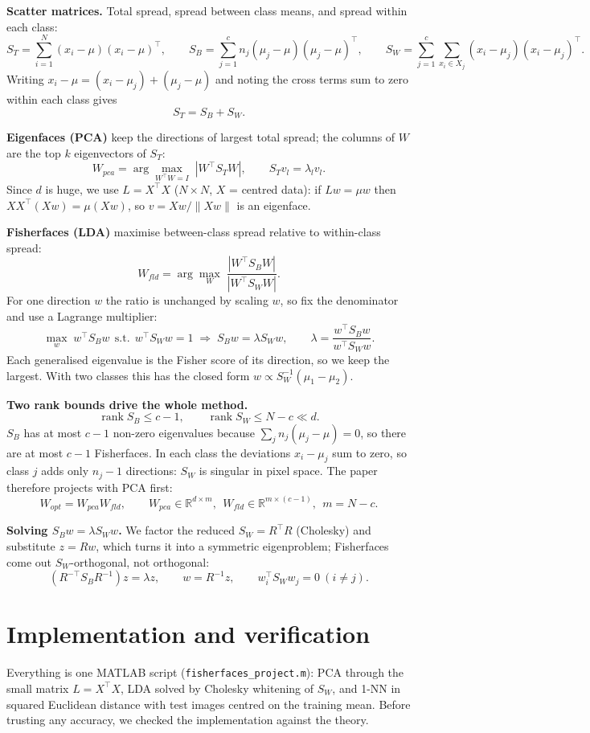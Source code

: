 \documentclass[11pt]{article}
\newcommand{\T}{^{\top}}
\begin{document}
\textbf{Scatter matrices.} Total spread, spread between class means, and spread within each class:
\[
S_T=\sum_{i=1}^{N}(x_i-\mu)(x_i-\mu)\T,\qquad
S_B=\sum_{j=1}^{c}n_j(\mu_j-\mu)(\mu_j-\mu)\T,\qquad
S_W=\sum_{j=1}^{c}\sum_{x_i\in X_j}(x_i-\mu_j)(x_i-\mu_j)\T .
\]
Writing $x_i-\mu=(x_i-\mu_j)+(\mu_j-\mu)$ and noting the cross terms sum to zero within each class gives
\[ S_T=S_B+S_W. \]

\textbf{Eigenfaces (PCA)} keep the directions of largest total spread; the columns of $W$ are the top $k$ eigenvectors of $S_T$:
\[ W_{pca}=\arg\max_{W\T W=I}\;|W\T S_TW|,\qquad S_Tv_l=\lambda_lv_l . \]
Since $d$ is huge, we use $L=X\T X$ ($N\times N$, $X$ = centred data): if $Lw=\mu w$ then $XX\T(Xw)=\mu(Xw)$, so $v=Xw/\|Xw\|$ is an eigenface.

\textbf{Fisherfaces (LDA)} maximise between-class spread relative to within-class spread:
\[ W_{fld}=\arg\max_W\;\frac{|W\T S_BW|}{|W\T S_WW|}. \]
For one direction $w$ the ratio is unchanged by scaling $w$, so fix the denominator and use a Lagrange multiplier:
\[ \max_w\; w\T S_Bw\ \ \text{s.t.}\ \ w\T S_Ww=1\;\Longrightarrow\; S_Bw=\lambda S_Ww,\qquad \lambda=\frac{w\T S_Bw}{w\T S_Ww}. \]
Each generalised eigenvalue is the Fisher score of its direction, so we keep the largest. With two classes this has the closed form $w\propto S_W^{-1}(\mu_1-\mu_2)$.

\textbf{Two rank bounds drive the whole method.}
\[ \operatorname{rank}S_B\le c-1,\qquad \operatorname{rank}S_W\le N-c\ll d. \]
$S_B$ has at most $c-1$ non-zero eigenvalues because $\sum_j n_j(\mu_j-\mu)=0$, so there are at most $c-1$ Fisherfaces. In each class the deviations $x_i-\mu_j$ sum to zero, so class $j$ adds only $n_j-1$ directions: $S_W$ is singular in pixel space. The paper therefore projects with PCA first:
\[ W_{opt}=W_{pca}W_{fld},\qquad W_{pca}\in\mathbb R^{d\times m},\ \ W_{fld}\in\mathbb R^{m\times(c-1)},\ \ m=N-c. \]

\textbf{Solving $S_Bw=\lambda S_Ww$.} We factor the reduced $S_W=R\T R$ (Cholesky) and substitute $z=Rw$, which turns it into a symmetric eigenproblem; Fisherfaces come out $S_W$-orthogonal, not orthogonal:
\[ \left(R^{-\top}S_BR^{-1}\right)z=\lambda z,\qquad w=R^{-1}z,\qquad w_i\T S_Ww_j=0\ (i\ne j). \]

\section{Implementation and verification}
Everything is one MATLAB script (\texttt{fisherfaces\_project.m}): PCA through the small matrix $L=X\T X$, LDA solved by Cholesky whitening of $S_W$, and 1-NN in squared Euclidean distance with test images centred on the training mean. Before trusting any accuracy, we checked the implementation against the theory.
\end{document}
